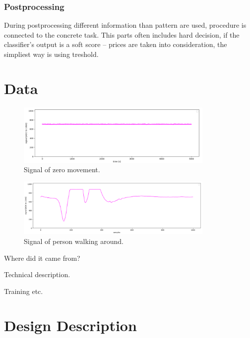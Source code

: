 \subsection*{Postprocessing}
During postprocessing different information than pattern are used, procedure is
connected to the concrete task. This parts often includes hard decision, if the
classifier's output is a soft score -- prices are taken into consideration,
the simpliest way is using treshold.



\chapter{Data}

\begin{figure}[h!]
\begin{center}
\includegraphics[width=0.85\textwidth]{obrazky-figures/signal_calm.png}
\caption{Signal of zero movement.\label{fig:signalcalm}}
\end{center}
\end{figure}

\begin{figure}[h!]
\begin{center}
\includegraphics[width=0.85\textwidth]{obrazky-figures/signal_walk.png}
\caption{Signal of person walking around.\label{fig:signalcalm}}
\end{center}
\end{figure}
Where did it came from?

Technical description.

Training etc.



\chapter{Design Description}

